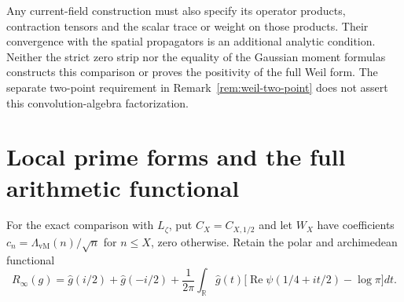\documentclass[11pt]{article}
\theoremstyle{definition}
\theoremstyle{remark}
\numberwithin{equation}{section}
\newcommand{\R}{\mathbb R}
\begin{document}
Any current-field construction must also specify its operator products,
contraction tensors and the scalar trace or weight on those products.
Their convergence with the spatial propagators is an additional analytic
condition.  Neither the strict zero strip nor the equality of the
Gaussian moment formulas constructs this comparison or proves the
positivity of the full Weil form.
The separate two-point requirement in Remark~\ref{rem:weil-two-point}
does not assert this convolution-algebra factorization.



\section{Local prime forms and the full arithmetic functional}
\label{sec:full-prime-comparison}

For the exact comparison with $L_\zeta$, put
$C_X=C_{X,1/2}$ and let $W_X$ have coefficients
$c_n=\Lambda_{\mathrm{vM}}(n)/\sqrt n$ for $n\leq X$, zero otherwise.
Retain the polar and archimedean functional
\[
 R_\infty(g)=\widehat g(i/2)+\widehat g(-i/2)
  +\frac1{2\pi}\int_{\R}\widehat g(t)
       \bigl[\operatorname{Re}\psi(1/4+it/2)-\log\pi\bigr]dt.
\]
\end{document}
